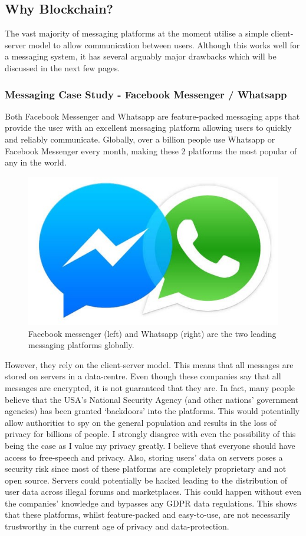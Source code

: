 \documentclass{article}
\begin{document}
\subsection{Why Blockchain?}
The vast majority of messaging platforms at the moment utilise a simple client-server model to allow communication between users. Although this works well for a messaging system, it has several arguably major drawbacks which will be discussed in the next few pages.

\subsubsection{Messaging Case Study - Facebook Messenger / Whatsapp}
Both Facebook Messenger and Whatsapp are feature-packed messaging apps that provide the user with an excellent messaging platform allowing users to quickly and reliably communicate. Globally, over a billion people use Whatsapp or Facebook Messenger every month, making these 2 platforms the most popular of any in the world.
\begin{figure}[h]
    \centering
    \includegraphics[width=0.4\linewidth]{Images/fbmsgwhtspp.jpeg}
    \caption{Facebook messenger (left) and Whatsapp (right) are the two leading messaging platforms globally.}
    \label{fig:fbmsgwhtspp}
\end{figure}
However, they rely on the client-server model. This means that all messages are stored on servers in a data-centre. Even though these companies say that all messages are encrypted, it is not guaranteed that they are. In fact, many people believe that the USA's National Security Agency (and other nations' government agencies) has been granted `backdoors' into the platforms. This would potentially allow authorities to spy on the general population and results in the loss of privacy for billions of people. I strongly disagree with even the possibility of this being the case as I value my privacy greatly. I believe that everyone should have access to free-speech and privacy.
Also, storing users' data on servers poses a security risk since most of these platforms are completely proprietary and not open source. Servers could potentially be hacked leading to the distribution of user data across illegal forums and marketplaces. This could happen without even the companies' knowledge and bypasses any GDPR data regulations. This shows that these platforms, whilst feature-packed and easy-to-use, are not necessarily trustworthy in the current age of privacy and data-protection.
\end{document}
